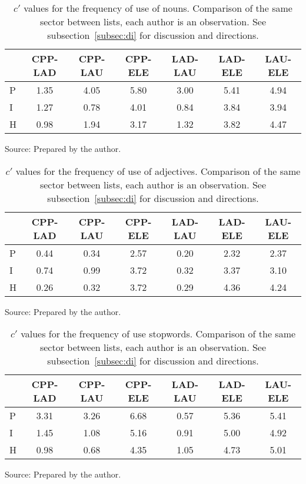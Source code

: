 \begin{table}
  \centering
  \caption{$c'$ values for the frequency of use of nouns. Comparison of the same sector between lists, each author is an observation. See subsection~\ref{subsec:di} for discussion and directions.}
    \small
\setlength{\tabcolsep}{.06667em}
  \begin{tabular}{|l|| c|c|c|c|c|c|}\hline
& CPP-LAD & CPP-LAU & CPP-ELE & LAD-LAU & LAD-ELE & LAU-ELE \\\hline
P & 1.35 & 4.05 & 5.80 & 3.00 & 5.41 & 4.94 \\\hline
I & 1.27 & 0.78 & 4.01 & 0.84 & 3.84 & 3.94 \\\hline
H & 0.98 & 1.94 & 3.17 & 1.32 & 3.82 & 4.47 \\\hline
  \end{tabular}
\begin{flushleft}
		Source: Prepared by the author.\
\end{flushleft}
  \label{tab:kolSubInter}
\end{table}

\begin{table}
  \centering
  \caption{$c'$ values for the frequency of use of adjectives. Comparison of the same sector between lists, each author is an observation. See subsection~\ref{subsec:di} for discussion and directions.}
    \small
\setlength{\tabcolsep}{.06667em}
  \begin{tabular}{|l|| c|c|c|c|c|c|}\hline
 & CPP-LAD & CPP-LAU & CPP-ELE & LAD-LAU & LAD-ELE & LAU-ELE \\\hline
P & 0.44 & 0.34 & 2.57 & 0.20 & 2.32 & 2.37 \\\hline
I & 0.74 & 0.99 & 3.72 & 0.32 & 3.37 & 3.10 \\\hline
H & 0.26 & 0.32 & 3.72 & 0.29 & 4.36 & 4.24 \\\hline
  \end{tabular}
\begin{flushleft}
		Source: Prepared by the author.\
\end{flushleft}
  \label{tab:kolAdjInter}
\end{table}

\begin{table}
  \centering
  \caption{$c'$ values for the frequency of use stopwords. Comparison of the same sector between lists, each author is an observation. See subsection~\ref{subsec:di} for discussion and directions.}
    \small
\setlength{\tabcolsep}{.06667em}
  \begin{tabular}{|l|| c|c|c|c|c|c|}\hline
 & CPP-LAD & CPP-LAU & CPP-ELE & LAD-LAU & LAD-ELE & LAU-ELE \\\hline
P & 3.31 & 3.26 & 6.68 & 0.57 & 5.36 & 5.41 \\\hline
I & 1.45 & 1.08 & 5.16 & 0.91 & 5.00 & 4.92 \\\hline
H & 0.98 & 0.68 & 4.35 & 1.05 & 4.73 & 5.01 \\\hline
  \end{tabular}
\begin{flushleft}
		Source: Prepared by the author.\
\end{flushleft}
  \label{tab:kolSwInter}
\end{table}

